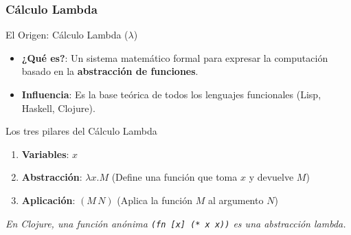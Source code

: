 \documentclass{beamer}
\begin{document}
\subsubsection{Cálculo Lambda}
\begin{frame}[fragile]{El Origen: Cálculo Lambda ($\lambda$)}
    \begin{itemize}
        \item \textbf{¿Qué es?}: Un sistema matemático formal para expresar la computación basado en la \textbf{abstracción de funciones}.
        \item \textbf{Influencia}: Es la base teórica de todos los lenguajes funcionales (Lisp, Haskell, Clojure).
    \end{itemize}

    \begin{exampleblock}{Los tres pilares del Cálculo Lambda}
        \begin{enumerate}
            \item \textbf{Variables}: $x$
            \item \textbf{Abstracción}: $\lambda x . M$ (Define una función que toma $x$ y devuelve $M$)
            \item \textbf{Aplicación}: $(M \, N)$ (Aplica la función $M$ al argumento $N$)
        \end{enumerate}
    \end{exampleblock}

    \vspace{0.3cm}
    \begin{center}
        \textit{En Clojure, una función anónima \texttt{(fn [x] (* x x))} es una abstracción lambda.}
    \end{center}
\end{frame}
\end{document}
